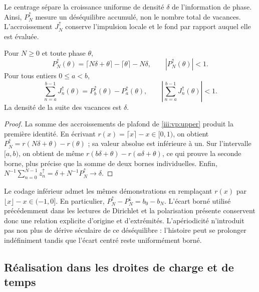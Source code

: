 Le centrage sépare la croissance uniforme de densité $\delta$ de
l’information de phase. Ainsi, $P_N^{\uparrow}$ mesure un déséquilibre accumulé,
non le nombre total de vacances. L’accroissement $J_N^{\uparrow}$ conserve
l’impulsion locale et le fond par rapport auquel elle est évaluée.

\begin{theorem}
Pour $N\geq0$ et toute phase $\theta$,
\begin{equation}
 P_N^{\uparrow}(\theta)
 =\lceil N\delta+\theta\rceil-\lceil\theta\rceil-N\delta,
 \qquad |P_N^{\uparrow}(\theta)|<1.
 \label{iii:vp:bound}
\end{equation}
Pour tous entiers $0\leq a<b$,
\begin{equation}
 \sum_{n=a}^{b-1}J_n^{\uparrow}(\theta)
 =P_b^{\uparrow}(\theta)-P_a^{\uparrow}(\theta),
 \qquad
 \left|\sum_{n=a}^{b-1}J_n^{\uparrow}(\theta)\right|<1.
 \label{iii:vp:continuity}
\end{equation}
La densité de la suite des vacances est $\delta$.
\end{theorem}
\begin{proof}
La somme des accroissements de plafond de \eqref{iii:vp:upper} produit la première identité. En écrivant $r(x)=\lceil x\rceil-x\in[0,1)$, on obtient $P_N^{\uparrow}=r(N\delta+\theta)-r(\theta)$ ; sa valeur absolue est inférieure à un. Sur l'intervalle $[a,b)$, on obtient de même $r(b\delta+\theta)-r(a\delta+\theta)$, ce qui prouve la seconde borne, plus précise que la somme de deux bornes individuelles. Enfin, $N^{-1}\sum_{n=0}^{N-1}z_n^{\uparrow}
=\delta+N^{-1}P_N^{\uparrow}\to\delta$.
\end{proof}

Le codage inférieur admet les mêmes démonstrations en remplaçant
$r(x)$ par $\lfloor x\rfloor-x\in(-1,0]$. En particulier,
$P_N^{\uparrow}-P_N^{\downarrow}=b_0-b_N$. L’écart borné
utilisé précédemment dans les lectures de Dirichlet et la polarisation
présente conservent donc une relation explicite d’origine et d’extrémités.
L’apériodicité n’introduit pas non plus de dérive séculaire de ce déséquilibre :
l’histoire peut se prolonger indéfiniment tandis que l’écart
centré reste uniformément borné.

\subsection{Réalisation dans les droites de charge et de temps}

